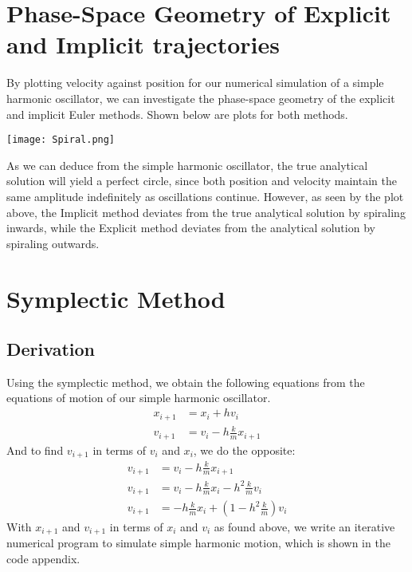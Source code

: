 \documentclass{scrartcl}
\begin{document}
\section{Phase-Space Geometry of Explicit and Implicit trajectories}
By plotting velocity against position for our numerical simulation of a simple harmonic oscillator, we can investigate the phase-space geometry of the explicit and implicit Euler methods. Shown below are plots for both methods.
\begin{center}
\texttt{[image: Spiral.png]}
\end{center}
As we can deduce from the simple harmonic oscillator, the true analytical solution will yield a perfect circle, since both position and velocity maintain the same amplitude indefinitely as oscillations continue. However, as seen by the plot above, the Implicit method deviates from the true analytical solution by spiraling inwards, while the Explicit method deviates from the analytical solution by spiraling outwards.
\section{Symplectic Method}
\subsection{Derivation}

Using the symplectic method, we obtain the following equations from the equations of motion of our simple harmonic oscillator.
\begin{align*}
x_{i+1} &= x_i + hv_{i} \\ 
v_{i+1} &= v_i - h\frac{k}{m}x_{i+1}
\end{align*}
And to find $v_{i+1}$ in terms of $v_{i}$ and $x_i$, we do the opposite:
\begin{align*}
v_{i+1} &= v_i - h\frac{k}{m}x_{i+1}\\
v_{i+1} &= v_i - h\frac{k}{m}x_{i} - h^{2}\frac{k}{m}v_{i} \\
v_{i+1} &= -h\frac{k}{m}x_i + (1-h^2\frac{k}{m})v_i 
\end{align*}
With $x_{i+1}$ and $v_{i+1}$ in terms of $x_{i}$ and $v_{i}$ as found above, we write an iterative numerical program to simulate simple harmonic motion, which is shown in the code appendix.
\end{document}
